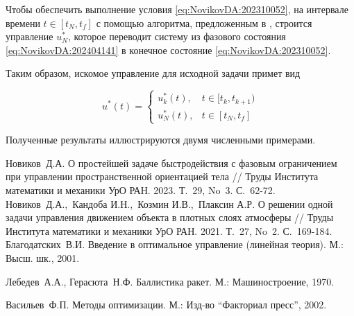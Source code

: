 Чтобы обеспечить выполнение условия \eqref{eq:NovikovDA:202310052}, на интервале времени $t\in[t_N,t_f]$ с помощью алгоритма, предложенным в \cite{1}, строится  управление $u^*_N$, которое переводит систему из фазового состояния \eqref{eq:NovikovDA:202404141} в конечное  состояние \eqref{eq:NovikovDA:202310052}.

Таким образом, искомое управление для исходной задачи примет вид

\begin{equation}
u^*(t)=	
\begin{cases}
u^*_k(t),& t\in[t_k,t_{k+1}) \\
u^*_N(t),& t\in[t_N,t_f] 
\end{cases}	
\end{equation}

Полученные результаты иллюстрируются двумя численными примерами.

\begin{thebibliography}{99}
Новиков~Д.А. {О простейшей задаче быстродействия с фазовым ограничением при управлении пространственной ориентацией тела} // Труды Института математики и механики УрО РАН. 2023. Т.~29, No~3. С.~62-72.
Новиков~Д.А.,~Кандоба И.Н.,~Козмин И.В.,~Плаксин А.Р. { О решении одной задачи управления движением объекта в плотных слоях атмосферы} // Труды Института математики и механики УрО РАН. 2021. Т.~27, No~2. С.~169-184.
 Благодатских~В.И. { Введение в оптимальное управление (линейная теория)}. М.: Высш. шк., 2001.

 Лебедев~А.А., Герасюта~Н.Ф. { Баллистика ракет}. М.: Машиностроение, 1970.

 Васильев~Ф.П. { Методы оптимизации}. М.: Изд-во ``Факториал пресс'', 2002.

\end{thebibliography}






%

